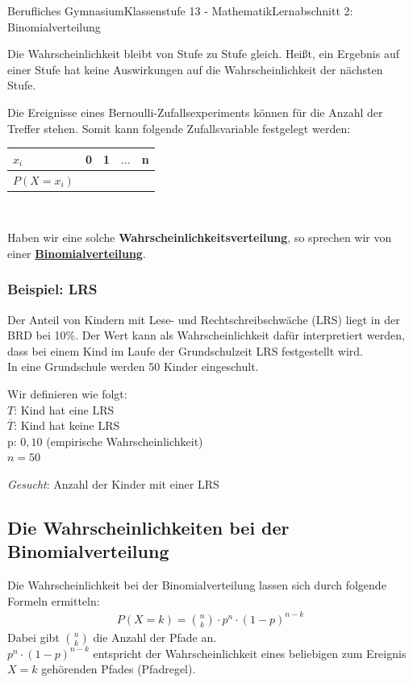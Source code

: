 \documentclass[11pt,twocolumn,oneside,openany,headings=optiontotoc,11pt,numbers=noenddot]{article}
\begin{document}
\begin{worksheet}{Berufliches Gymnasium}{Klassenstufe 13 - Mathematik}{Lernabschnitt 2: Binomialverteilung}
\begin{framed}
			Die Wahrscheinlichkeit bleibt von Stufe zu Stufe gleich. Heißt, ein Ergebnis auf einer Stufe hat keine Auswirkungen auf die Wahrscheinlichkeit der nächsten Stufe.
		\end{framed}
		Die Ereignisse eines Bernoulli-Zufallsexperiments können für die \glqq{}Anzahl der Treffer\grqq{} stehen. Somit kann folgende Zufallsvariable festgelegt werden:\\
		\par\noindent
		\renewcommand{\arraystretch}{1.5}
		\begin{tabularx}{0.48\textwidth}{|l|M|M|M|M|}
			\hline
			\(x_i\) & 0 & 1 & $\ldots$ & n\\
			\hline
			\(P(X = x_i)\) & & & &\\
			\hline
		\end{tabularx}\\
		\par\noindent
		Haben wir eine solche \textbf{Wahrscheinlichkeitsverteilung}, so sprechen wir von einer \textbf{\underline{Binomialverteilung}}.\\
		\subsubsection*{Beispiel: LRS}
		\begin{framed}
			\noindent
			Der Anteil von Kindern mit Lese- und Rechtschreibschwäche (LRS) liegt in der BRD bei 10\%. Der Wert kann als Wahrscheinlichkeit dafür interpretiert werden, dass bei einem Kind im Laufe der Grundschulzeit LRS festgestellt wird.\\
			In eine Grundschule werden 50 Kinder eingeschult.
		\end{framed}
		Wir definieren wie folgt:\\
		\(T\): Kind hat eine LRS\\
		\(\overline{T}\): Kind hat keine LRS\\
		p: \(0,10\) (empirische Wahrscheinlichkeit)\\
		\(n = 50\)\\
		\par\noindent
		\textit{Gesucht}: Anzahl der Kinder mit einer LRS
		\subsection{Die Wahrscheinlichkeiten bei der Binomialverteilung}
		Die Wahrscheinlichkeit bei der Binomialverteilung lassen sich durch folgende Formeln  ermitteln:
		\begin{align*}
			P(X=k) = \binom{n}{k}\cdot{}p^n\cdot(1-p)^{n-k}
		\end{align*}
		Dabei gibt \(\binom{n}{k}\) die Anzahl der Pfade an.\\
		\(p^n\cdot(1-p)^{n-k}\) entspricht der Wahrscheinlichkeit eines beliebigen zum Ereignis \(X = k\) gehörenden Pfades (\grqq{}Pfadregel\grqq{}).

\end{worksheet}
\end{document}
